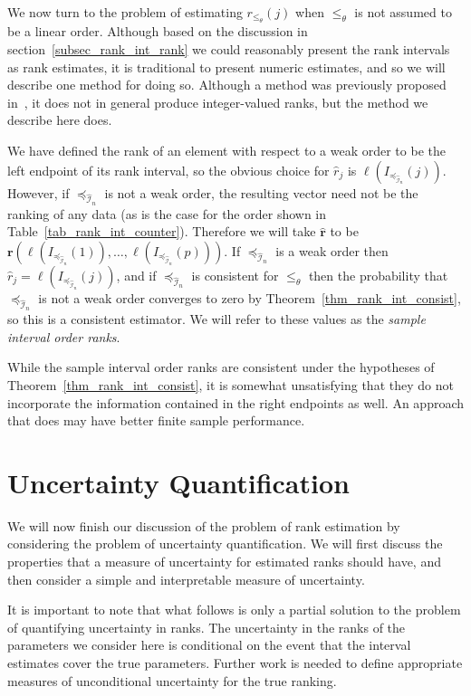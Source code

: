 \documentclass[12pt]{article}
\newcommand{\pord}{{\leqslant_{\theta}}}
\newcommand{\iordn}{{\preceq_{\hat{\mathcal{I}}_{n}}}}
\numberwithin{theorem}{section}
\begin{document}
We now turn to the problem of estimating $r_\pord(j)$ when $\pord$ is not assumed to be a linear order.  Although based on the discussion in section~\ref{subsec_rank_int_rank} we could reasonably present the rank intervals as rank estimates, it is traditional to present numeric estimates, and so we will describe one method for doing so.  Although a method was previously proposed in~\cite{xie2009ties}, it does not in general produce integer-valued ranks, but the method we describe here does.

We have defined the rank of an element with respect to a weak order to be the left endpoint of its rank interval, so the obvious choice for $\hat{r}_j$ is $\ell(I_\iordn(j))$.  However, if $\iordn$ is not a weak order, the resulting vector need not be the ranking of any data (as is the case for the order shown in Table~\ref{tab_rank_int_counter}).  Therefore we will take $\hat{\mathbf{r}}$ to be $\mathbf{r}(\ell(I_\iordn(1)), \dots, \ell(I_\iordn(p)))$.  If $\iordn$ is a weak order then $\hat{r}_j = \ell(I_\iordn(j))$, and if $\iordn$ is consistent for $\pord$ then the probability that $\iordn$ is not a weak order converges to zero by Theorem~\ref{thm_rank_int_consist}, so this is a consistent estimator.  We will refer to these values as the \emph{sample interval order ranks}.

While the sample interval order ranks are consistent under the hypotheses of Theorem~\ref{thm_rank_int_consist}, it is somewhat unsatisfying that they do not incorporate the information contained in the right endpoints as well.  An approach that does may have better finite sample performance.

\section{Uncertainty Quantification}
\label{sec_uncert_quant}

We will now finish our discussion of the problem of rank estimation by considering the problem of uncertainty quantification.  We will first discuss the properties that a measure of uncertainty for estimated ranks should have, and then consider a simple and interpretable measure of uncertainty.

It is important to note that what follows is only a partial solution to the problem of quantifying uncertainty in ranks.  The uncertainty in the ranks of the parameters we consider here is conditional on the event that the interval estimates cover the true parameters.  Further work is needed to define appropriate measures of unconditional uncertainty for the true ranking.
\end{document}

